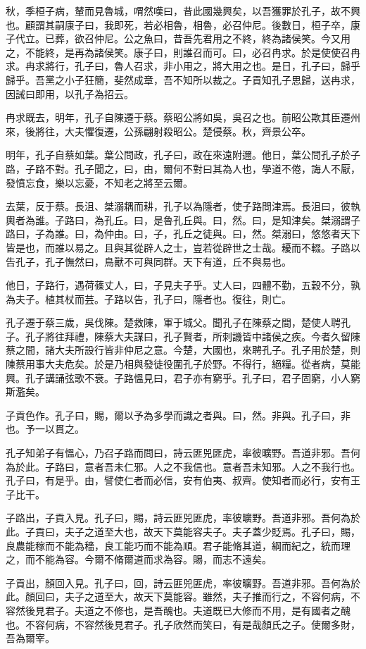 秋，季桓子病，輦而見魯城，喟然嘆曰，昔此國幾興矣，以吾獲罪於孔子，故不興也。顧謂其嗣康子曰，我即死，若必相魯，相魯，必召仲尼。後數日，桓子卒，康子代立。已葬，欲召仲尼。公之魚曰，昔吾先君用之不終，終為諸侯笑。今又用之，不能終，是再為諸侯笑。康子曰，則誰召而可。曰，必召冉求。於是使使召冉求。冉求將行，孔子曰，魯人召求，非小用之，將大用之也。是日，孔子曰，歸乎歸乎。吾黨之小子狂簡，斐然成章，吾不知所以裁之。子貢知孔子思歸，送冉求，因誡曰即用，以孔子為招云。

冉求既去，明年，孔子自陳遷于蔡。蔡昭公將如吳，吳召之也。前昭公欺其臣遷州來，後將往，大夫懼復遷，公孫翩射殺昭公。楚侵蔡。秋，齊景公卒。

明年，孔子自蔡如葉。葉公問政，孔子曰，政在來遠附邇。他日，葉公問孔子於子路，子路不對。孔子聞之，曰，由，爾何不對曰其為人也，學道不倦，誨人不厭，發憤忘食，樂以忘憂，不知老之將至云爾。

去葉，反于蔡。長沮、桀溺耦而耕，孔子以為隱者，使子路問津焉。長沮曰，彼執輿者為誰。子路曰，為孔丘。曰，是魯孔丘與。曰，然。曰，是知津矣。桀溺謂子路曰，子為誰。曰，為仲由。曰，子，孔丘之徒與。曰，然。桀溺曰，悠悠者天下皆是也，而誰以易之。且與其從辟人之士，豈若從辟世之士哉。耰而不輟。子路以告孔子，孔子憮然曰，鳥獸不可與同群。天下有道，丘不與易也。

他日，子路行，遇荷蓧丈人，曰，子見夫子乎。丈人曰，四體不勤，五穀不分，孰為夫子。植其杖而芸。子路以告，孔子曰，隱者也。復往，則亡。

孔子遷于蔡三歲，吳伐陳。楚救陳，軍于城父。聞孔子在陳蔡之間，楚使人聘孔子。孔子將往拜禮，陳蔡大夫謀曰，孔子賢者，所刺譏皆中諸侯之疾。今者久留陳蔡之間，諸大夫所設行皆非仲尼之意。今楚，大國也，來聘孔子。孔子用於楚，則陳蔡用事大夫危矣。於是乃相與發徒役圍孔子於野。不得行，絕糧。從者病，莫能興。孔子講誦弦歌不衰。子路慍見曰，君子亦有窮乎。孔子曰，君子固窮，小人窮斯濫矣。

子貢色作。孔子曰，賜，爾以予為多學而識之者與。曰，然。非與。孔子曰，非也。予一以貫之。

孔子知弟子有慍心，乃召子路而問曰，詩云匪兕匪虎，率彼曠野。吾道非邪。吾何為於此。子路曰，意者吾未仁邪。人之不我信也。意者吾未知邪。人之不我行也。孔子曰，有是乎。由，譬使仁者而必信，安有伯夷、叔齊。使知者而必行，安有王子比干。

子路出，子貢入見。孔子曰，賜，詩云匪兕匪虎，率彼曠野。吾道非邪。吾何為於此。子貢曰，夫子之道至大也，故天下莫能容夫子。夫子蓋少貶焉。孔子曰，賜，良農能稼而不能為穡，良工能巧而不能為順。君子能脩其道，綱而紀之，統而理之，而不能為容。今爾不脩爾道而求為容。賜，而志不遠矣。

子貢出，顏回入見。孔子曰，回，詩云匪兕匪虎，率彼曠野。吾道非邪。吾何為於此。顏回曰，夫子之道至大，故天下莫能容。雖然，夫子推而行之，不容何病，不容然後見君子。夫道之不修也，是吾醜也。夫道既已大修而不用，是有國者之醜也。不容何病，不容然後見君子。孔子欣然而笑曰，有是哉顏氏之子。使爾多財，吾為爾宰。

